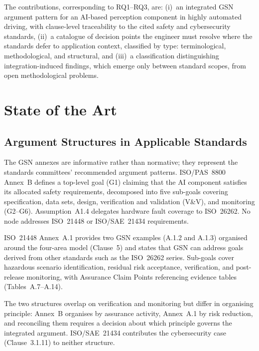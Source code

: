 \documentclass[runningheads]{llncs}
\newcommand{\new}[1]{#1}
\newcommand{\new}[1]{\textcolor{blue}{#1}}
\begin{document}
	The contributions, corresponding to RQ1--RQ3, are: (i)~an integrated GSN argument pattern for an AI-based perception component in highly automated driving, with clause-level traceability to the cited safety and cybersecurity standards, (ii)~a catalogue of decision points the engineer must resolve where the standards defer to application context, classified by type: terminological, methodological, and structural, and (iii)~a classification distinguishing integration-induced findings, which emerge only between standard scopes, from open methodological problems.
	
	\section{State of the Art}
	\label{sec:soa}
	
	\subsection{Argument Structures in Applicable Standards}
	\label{sec:existing_gsn}
	The GSN annexes are informative rather than normative; they represent the standards committees' recommended argument patterns. ISO/PAS~8800 Annex~B defines a top-level goal (G1) claiming that the AI component satisfies its allocated safety requirements, decomposed into five sub-goals covering specification, data sets, design, verification and validation (V\&V), and monitoring (G2--G6). Assumption~A1.4 delegates hardware fault coverage to ISO~26262. No node addresses ISO~21448 or ISO/SAE~21434 requirements.
	
	ISO~21448 Annex~A.1 provides \new{two GSN examples (A.1.2 and A.1.3)} organised around the four-area model (Clause~5)\new{ and states that GSN can address goals derived from other standards such as the ISO~26262 series}. Sub-goals cover hazardous scenario identification, residual risk acceptance, verification, and post-release monitoring, with Assurance Claim Points referencing evidence tables (Tables~A.7--A.14).
	
	The two structures overlap on verification and monitoring but differ in organising principle: Annex~B organises by assurance activity, Annex~A.1 by risk reduction, and reconciling them requires a decision about which principle governs the integrated argument. ISO/SAE~21434 contributes the cybersecurity case (Clause~3.1.11) to neither structure.
	
\end{document}
